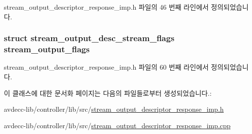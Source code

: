 stream\+\_\+output\+\_\+descriptor\+\_\+response\+\_\+imp.\+h 파일의 46 번째 라인에서 정의되었습니다.

\subsubsection[{\texorpdfstring{stream\+\_\+output\+\_\+flags}{stream_output_flags}}]{\setlength{\rightskip}{0pt plus 5cm}struct {\bf stream\+\_\+output\+\_\+desc\+\_\+stream\+\_\+flags} stream\+\_\+output\+\_\+flags\hspace{0.3cm}{\ttfamily [private]}}\hypertarget{classavdecc__lib_1_1stream__output__descriptor__response__imp_a46da0a71335bf6463cafb4c34ac12e27}{}\label{classavdecc__lib_1_1stream__output__descriptor__response__imp_a46da0a71335bf6463cafb4c34ac12e27}


stream\+\_\+output\+\_\+descriptor\+\_\+response\+\_\+imp.\+h 파일의 60 번째 라인에서 정의되었습니다.



이 클래스에 대한 문서화 페이지는 다음의 파일들로부터 생성되었습니다.\+:\begin{DoxyCompactItemize}
\item 
avdecc-\/lib/controller/lib/src/\hyperlink{stream__output__descriptor__response__imp_8h}{stream\+\_\+output\+\_\+descriptor\+\_\+response\+\_\+imp.\+h}\item 
avdecc-\/lib/controller/lib/src/\hyperlink{stream__output__descriptor__response__imp_8cpp}{stream\+\_\+output\+\_\+descriptor\+\_\+response\+\_\+imp.\+cpp}\end{DoxyCompactItemize}
